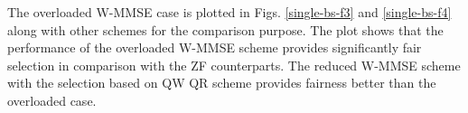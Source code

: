 The overloaded W-MMSE case is plotted in Figs. \ref{single-bs-f3} and  \ref{single-bs-f4} along with other schemes for the comparison purpose. The plot shows that the performance of the overloaded W-MMSE scheme provides significantly fair selection in comparison with the ZF counterparts. The reduced W-MMSE scheme with the selection based on QW QR scheme provides fairness better than the overloaded case.
